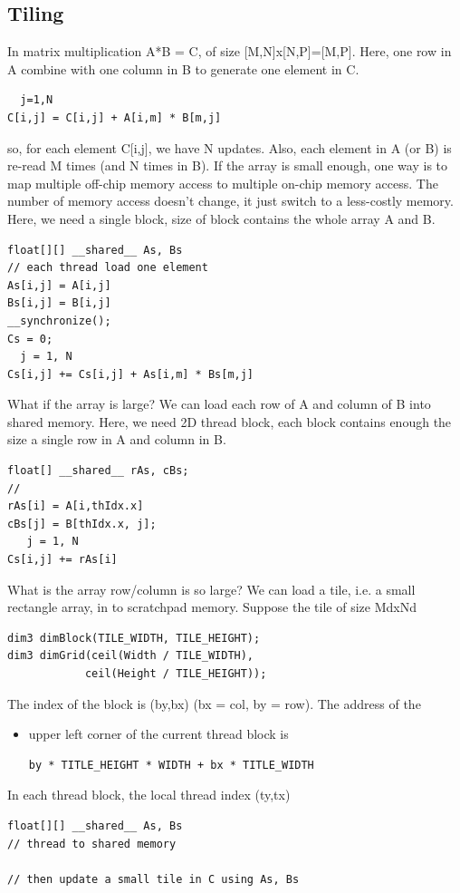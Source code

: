 \subsection{Tiling}
\label{sec:tiling-1}

In matrix multiplication A*B = C, of size [M,N]x[N,P]=[M,P]. Here, one
row in A combine with one column in B to generate one element in C.
\begin{lstlisting}
  j=1,N
C[i,j] = C[i,j] + A[i,m] * B[m,j]
\end{lstlisting}
so, for each element C[i,j], we have N updates. Also, each element in
A (or B) is re-read M times (and N times in B). If the array is small
enough, one way is to map multiple off-chip memory access to multiple
on-chip memory access. The number  of memory access doesn't change, it
just switch to a less-costly memory. Here, we need a single block,
size of block contains the whole array A and B.
\begin{lstlisting}
float[][] __shared__ As, Bs
// each thread load one element
As[i,j] = A[i,j]
Bs[i,j] = B[i,j]
__synchronize();
Cs = 0;
  j = 1, N
Cs[i,j] += Cs[i,j] + As[i,m] * Bs[m,j]
\end{lstlisting}

What if the array is large? We can load each row of A and column of B
into shared memory. Here, we need 2D thread block, each block contains
enough the size a single row in A and column in B.
\begin{lstlisting}
float[] __shared__ rAs, cBs;
// 
rAs[i] = A[i,thIdx.x]
cBs[j] = B[thIdx.x, j];
   j = 1, N
Cs[i,j] += rAs[i]
\end{lstlisting}

What is the array row/column is so large? We can load a tile, i.e. a
small rectangle array, in to scratchpad memory. Suppose the tile of
size MdxNd
\begin{lstlisting}
dim3 dimBlock(TILE_WIDTH, TILE_HEIGHT);
dim3 dimGrid(ceil(Width / TILE_WIDTH),
            ceil(Height / TILE_HEIGHT));
\end{lstlisting}
The index of the block is (by,bx) (bx = col, by = row).  The address
of the
\begin{itemize}
\item upper left corner of the current thread block is
\begin{lstlisting}
by * TITLE_HEIGHT * WIDTH + bx * TITLE_WIDTH
\end{lstlisting}
\end{itemize}
In each thread block, the local thread index (ty,tx) 
\begin{lstlisting}
float[][] __shared__ As, Bs
// thread to shared memory

// then update a small tile in C using As, Bs

\end{lstlisting}





